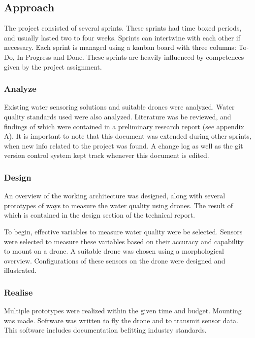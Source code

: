 \newpage
\subsection{Approach} \label{approach}
The project consisted of several sprints. These sprints had time boxed periods, and usually lasted two to four weeks. Sprints can intertwine with each other if necessary. Each sprint is managed using a kanban \cite{kanban} board with three columns: To-Do, In-Progress and Done. These sprints are heavily influenced by competences given by the project assignment. \cite{assignmentform}

\subsubsection{Analyze} \label{sprint:analyze}
Existing water sensoring solutions and suitable drones were analyzed. Water quality standards used were also analyzed. Literature was be reviewed, and findings of which were contained in a preliminary research report (see appendix A). It is important to note that this document was extended during other sprints, when new info related to the project was found. A change log as well as the git version control system \cite{git} kept track whenever this document is edited.

\subsubsection{Design} \label{sprint:design}
An overview of the working architecture was designed, along with several prototypes of ways to measure the water quality using drones. The result of which is contained in the design section of the technical report.

To begin, effective variables to measure water quality were be selected. Sensors were selected to measure these variables based on their accuracy and capability to mount on a drone. A suitable drone was chosen using a morphological overview. Configurations of these sensors on the drone were designed and illustrated. 

\subsubsection{Realise} \label{sprint:realise}
Multiple prototypes were realized within the given time and budget. Mounting was made. Software was written to fly the drone and to transmit sensor data. This software includes documentation befitting industry standards.

